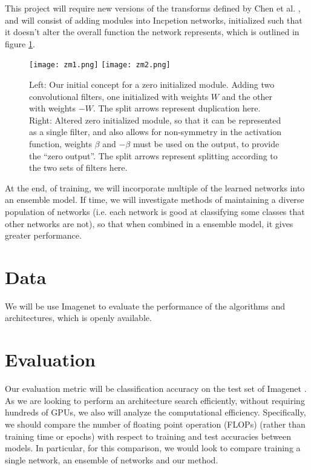 \documentclass[10pt,letterpaper]{article}
\begin{document}
This project will require new versions of the transforms defined by Chen et al. \cite{net2net}, and will consist of adding modules into Incpetion networks, initialized such that it doesn't alter the overall function the network represents, which is outlined in figure \ref{fig:zero_init_modules}.

\begin{figure}[h]
	\centering
    \texttt{[image: zm1.png]} \hspace{1cm}
    \texttt{[image: zm2.png]} \vspace{1cm}
    \caption{Left: Our initial concept for a zero initialized module. Adding two convolutional filters, one initialized with weights $W$ and the other with weights $-W$. The split arrows represent duplication here. Right: Altered zero initialized module, so that it can be represented as a single filter, and also allows for non-symmetry in the activation function, weights $\beta$ and $-\beta$ must be used on the output, to provide the ``zero output''. The split arrows represent splitting according to the two sets of filters here.}
	\label{fig:zero_init_modules}
\end{figure}

At the end, of training, we will incorporate multiple of the learned networks into an ensemble model. If time, we will investigate methods of maintaining a diverse population of networks (i.e. each network is good at classifying some classes that other networks are not), so that when combined in a ensemble model, it gives greater performance.


\section{Data}
We will be use Imagenet \cite{imagenet} to evaluate the performance of the algorithms and architectures, which is openly available. 


\section{Evaluation}
Our evaluation metric will be classification accuracy on the test set of Imagenet \cite{imagenet}. As we are looking to perform an architecture search efficiently, without requiring hundreds of GPUs, we also will analyze the computational efficiency. Specifically, we should compare the number of floating point operation (FLOPs) (rather than training time or epochs) with respect to training and test accuracies between models. In particular, for this comparison, we would look to compare training a single network, an ensemble of networks and our method.
\end{document}
